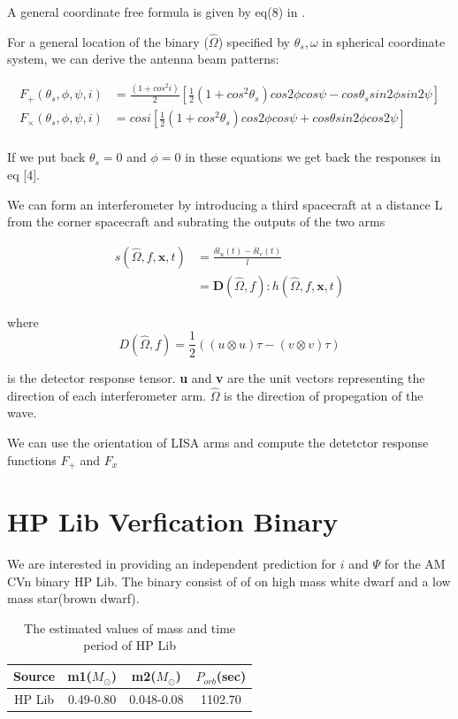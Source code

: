 \documentclass[10pt,a4paper]{article}
\begin{document}
A general coordinate free formula is given by eq(8) in \cite{cornish}. 

For a general location of the binary ($\hat{\Omega}$) specified by $\theta_s,\omega$ in spherical coordinate system, we can derive the antenna beam patterns:

\begin{align*}
F_{+}(\theta_s,\phi,\psi,i)&=\frac{(1+cos^2 i)}{2} \left[\frac{1}{2}(1+ cos^2 \theta_s) cos2\phi cos\psi - cos\theta_s sin2\phi sin2\psi \right]\\
F_{\times}(\theta_s,\phi,\psi,i)&=cos i \left[\frac{1}{2}(1+ cos^2 \theta_s) cos2\phi cos\psi + cos\theta sin2\phi cos2\psi \right]\\ 
\end{align*}

If we put back $\theta_s=0$ and $\phi=0$ in these equations we get back the responses in eq [4].

We can form an interferometer by introducing a third spacecraft at a distance L from the corner spacecraft and subrating the outputs of the two arms \cite{cornsih}


\begin{align}
s(\hat{\Omega},f,\textbf{x},t)&=\frac{\delta l_u (t) - \delta l_v (t)}{l}\\
&=\textbf{D}(\hat{\Omega},f) : h(\hat{\Omega},f,\textbf{x},t)
\end{align}

where $$D(\hat{\Omega},f) = \frac{1}{2}\left((u \otimes u) \tau - (v \otimes v) \tau \right)$$

is the detector response tensor. \textbf{u} and \textbf{v} are the unit vectors representing the direction of each interferometer arm. $\hat{\Omega}$ is the direction of propegation of the wave.

We can use the orientation of LISA arms and compute the detetctor response functions $F_{+}$ and $F_{x}$


\section*{HP Lib Verfication Binary}

We are interested in providing an independent prediction for $i$ and $\Psi$ for the AM CVn binary HP Lib. The binary consist of of on high mass white dwarf and a low mass star(brown dwarf).\\

\begin{table}[H]
\centering
\begin{tabular}{|c|c|c|c|}
\hline 
\rule[-1ex]{0pt}{2.5ex} Source & m1($M_{\odot}$) & m2($M_{\odot}$) & $P_{orb}$(sec) \\ 
\hline 
\rule[-1ex]{0pt}{2.5ex} HP Lib & 0.49-0.80 & 0.048-0.08 & 1102.70 \\ 
\hline 
\end{tabular}
\caption{The estimated values of mass and time period of HP Lib}
\end{table}
\end{document}
